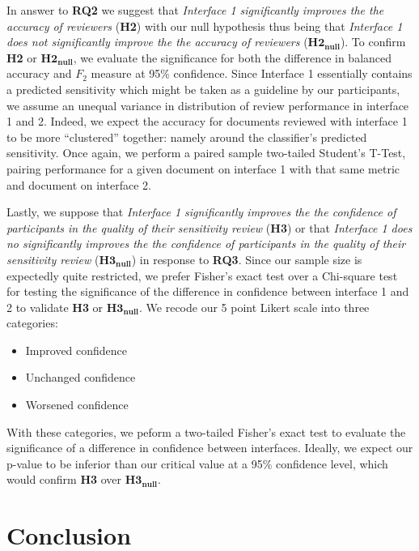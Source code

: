 \documentclass[\version]{l4proj}
\begin{document}
In answer to \textbf{RQ2} we suggest that \textit{Interface 1 significantly improves the the accuracy of reviewers} (\textbf{H2}) with our null hypothesis thus being that \textit{Interface 1 does not significantly improve the the accuracy of reviewers} (\(\mathbf{H2_{null}}\)).
To confirm \textbf{H2} or \(\mathbf{H2_{null}}\), we evaluate the significance for both the difference in balanced accuracy and \(F_{2}\) measure at 95\% confidence.
Since Interface 1 essentially contains a predicted sensitivity which might be taken as a guideline by our participants, we assume an unequal variance in distribution of review performance in interface 1 and 2.
Indeed, we expect the accuracy for documents reviewed with interface 1 to be more ``clustered'' together: namely around the classifier's predicted sensitivity.
Once again, we perform a paired sample two-tailed Student's T-Test, pairing performance for a given document on interface 1 with that same metric and document on interface 2.

Lastly, we suppose that \textit{Interface 1 significantly improves the the confidence of participants in the quality of their sensitivity review} (\textbf{H3}) or that \textit{Interface 1 does no significantly improves the the confidence of participants in the quality of their sensitivity review} (\(\mathbf{H3_{null}}\)) in response to \textbf{RQ3}.
Since our sample size is expectedly quite restricted, we prefer Fisher's exact test over a Chi-square test for testing the significance of the difference in confidence between interface 1 and 2 to validate \textbf{H3} or \(\mathbf{H3_{null}}\).
We recode our 5 point Likert scale into three categories:
%
\begin{itemize}[noitemsep,nolistsep]
    \item Improved confidence
    \item Unchanged confidence
    \item Worsened confidence
\end{itemize}
%
With these categories, we peform a two-tailed Fisher's exact test to evaluate the significance of a difference in confidence between interfaces.
Ideally, we expect our p-value to be inferior than our critical value at a 95\% confidence level, which would confirm \textbf{H3} over \(\mathbf{H3_{null}}\).

\chapter{Conclusion}
\end{document}
